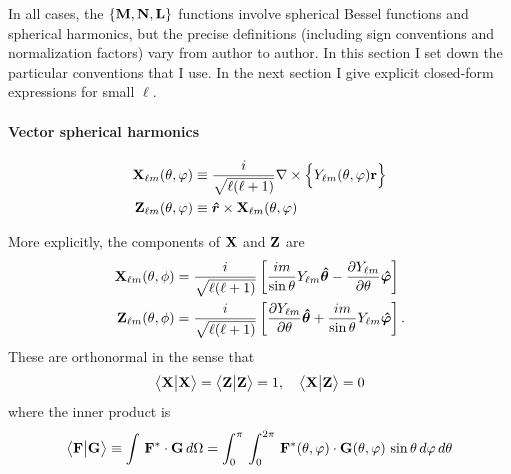 \documentclass[letterpaper]{article}
\newcommand{\lm}{_{\ell m}}
\begin{document}
In all cases, the $\{\mathbf{M}, \mathbf{N}, \mathbf{L}\}$
functions involve spherical Bessel functions and
spherical harmonics, but the precise definitions (including
sign conventions and normalization factors) vary from author
to author. In this section I set down the particular
conventions that I use. In the next section I give
explicit closed-form expressions for small $\ell$.

\paragraph{Vector spherical harmonics}
\begin{align*}
  \vb X\lm(\theta, \varphi) 
&\equiv \frac{i}{\sqrt{\ell(\ell+1)}}\nabla \times 
     \Big\{Y\lm(\theta, \varphi) \vb r\Big\}
\\
  \vb Z\lm(\theta, \varphi) &\equiv \vbhat{r} \times \vb X\lm(\theta, \varphi)
\end{align*}

\noindent More explicitly, the components of $\mathbf{X}$ and $\mathbf{Z}$ are
\begin{align*}
\vb X\lm(\theta, \phi) 
&= 
   \frac{i}{\sqrt{\ell(\ell+1)}}
   \left[  \frac{im}{\sin\theta}Y_{\ell m} \vbhatt{\theta}
           -\pard{Y_{\ell m}}{\theta}\vbhatt{\varphi}
   \right]
\\
\vb Z\lm(\theta, \phi) 
&=
   \frac{i}{\sqrt{\ell(\ell+1)}}
   \left[   \pard{Y_{\ell m}}{\theta}\vbhatt{\theta}
           +\frac{im}{\sin\theta}Y_{\ell m} \vbhatt{\varphi}
   \right].
\end{align*}
These are orthonormal in the sense that 
$$ \big\langle \mathbf{X} \big| \mathbf{X} \big\rangle= \big\langle \mathbf{Z} \big| \mathbf{Z} \big\rangle=1,
   \quad \big\langle \mathbf{X} \big| \mathbf{Z} \big\rangle=0
$$
where the inner product is
$$
   \big\langle \mathbf{F} \big| \mathbf{G} \big\rangle\equiv \int \, \mathbf{F}^* \cdot \mathbf{G} \, d\Omega
   = \int_0^\pi \, \int_0^{2\pi} \, 
     \mathbf{F}^*(\theta,\varphi)\cdot \mathbf{G}(\theta, \varphi)\,\sin\theta\,d\varphi\,d\theta
$$
\end{document}
